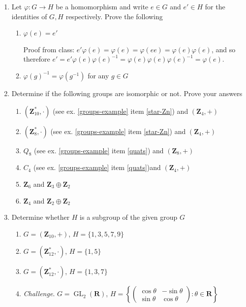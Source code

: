 \documentclass[12pt]{article}
\numberwithin{equation}{subsection}
\theoremstyle{note}
\newcommand{\GL}{\operatorname{GL}}
\begin{document}
\begin{enumerate}[label=\arabic*.]
	\item Let $\varphi\colon G\to H$ be a homomorphism and write $e\in G$ and $e'\in H$ for the identities of $G,H$ respectively. Prove the following 
	\begin{enumerate}
		\item $\varphi(e)=e'$
		
		{\color{violet}
		Proof from class: $e'\varphi(e)=\varphi(e)=\varphi(ee)=\varphi(e)\varphi(e)$, and so therefore $e'=e'\varphi(e)\varphi(e)^{-1}=\varphi(e)\varphi(e)\varphi(e)^{-1}=\varphi(e)$.
		}
		\item $\varphi(g)^{-1}=\varphi(g^{-1})$ for any $g\in G$
	\end{enumerate}
	
	\item Determine if the following groups are isomorphic or not. Prove your answers
	\begin{enumerate}
		\item $(\mathbf{Z}_{10}^*,\cdot)$ (see ex. \ref{groups-example} item \ref{star-Zn}) and $(\mathbf{Z}_4,+)$
		\item $(\mathbf{Z}_8^*,\cdot)$ (see ex. \ref{groups-example} item \ref{star-Zn}) and $(\mathbf{Z}_4,+)$
		\item $Q_8$ (see ex. \ref{groups-example} item \ref{quats}) and $(\mathbf{Z}_8,+)$
		\item $C_4$ (see ex. \ref{groups-example} item \ref{quats})and $(\mathbf{Z}_4,+)$
		\item $\mathbf{Z}_6$ and $\mathbf{Z}_3\oplus \mathbf{Z}_2$
		\item $\mathbf{Z}_4$ and $\mathbf{Z}_2 \oplus \mathbf{Z}_2$
	\end{enumerate}

	\item Determine whether $H$ is a subgroup of the given group $G$
	
	\begin{enumerate}
		\item $G=(\mathbf{Z}_{10},+)$, $H=\{1,3,5,7,9\}$
		\item $G=(\mathbf{Z}_{12}^*,\cdot)$, $H=\{1,5\}$
		\item $G=(\mathbf{Z}_{12}^*,\cdot)$, $H=\{1,3,7\}$
		\item \textit{Challenge}. $G=\GL_2(\mathbf{R})$, $H=\left\{ \begin{pmatrix} \cos \theta & -\sin \theta \\ \sin \theta & \cos \theta \end{pmatrix} : \theta\in \mathbf{R}  \right\}$
	\end{enumerate}
	

\end{enumerate}
\end{document}
